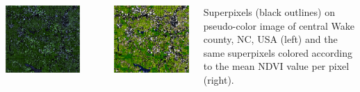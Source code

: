 \documentclass[25pt, margin=0mm, innermargin=25mm, blockverticalspace=25mm, colspace=25mm, subcolspace=8mm]{tikzposter}
\begin{document}
\begin{columns}
{\vspace*{0.7cm}

\begin{minipage}{0.5\linewidth}
\begin{center}
\includegraphics[width=\textwidth]{superpixels_slic_pseudo}
\end{center}
\end{minipage}
~
\begin{minipage}{0.5\linewidth}
\begin{center}
\includegraphics[width=\textwidth]{superpixels_slic_colored}
\end{center}
\end{minipage}
\vspace{2mm}
\begin{center}
Superpixels (black outlines) on pseudo-color image of central Wake county, NC, USA (left)
and the same superpixels colored according to the mean NDVI value per pixel (right).
\end{center}

}
\end{columns}
\end{document}
